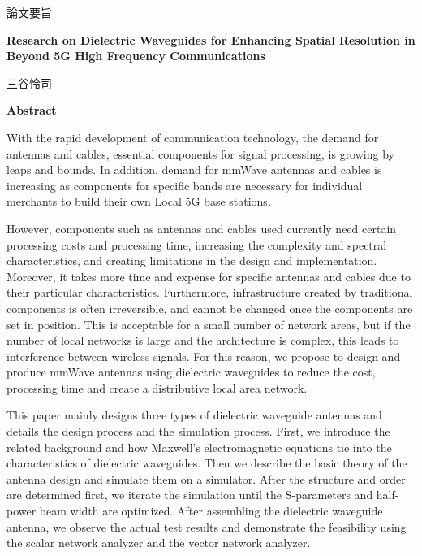 \documentclass[a4paper,12pt]{report}
\begin{document}
\thispagestyle{plain}
\begin{center}
    \Large
    \begin{CJK}{UTF8}{ipxm}論文要旨\end{CJK}

    \vspace{2.0cm}

    \Large
    \textbf{Research on Dielectric Waveguides for Enhancing Spatial Resolution in Beyond 5G High Frequency Communications}
        
    \vspace{0.4cm}
    \large
        
    \vspace{0.4cm}
    \begin{CJK}{UTF8}{ipxm}三谷怜司\end{CJK}
       
    \vspace{0.9cm}
    \textbf{Abstract}
\end{center}

With the rapid development of communication technology, the demand
for antennas and cables, essential components for signal processing,
is growing by leaps and
bounds.
In addition,
demand for mmWave antennas and cables is increasing as
components for specific bands are necessary for individual
merchants to build their own Local 5G base stations.

However, components such as antennas and cables used
currently need certain
processing costs and processing time,
increasing the complexity and spectral characteristics,
and creating limitations in the design and implementation.
Moreover, it takes
more time and expense for specific antennas and cables
due to their particular
characteristics.
Furthermore, infrastructure created by traditional components
is often irreversible, and cannot be changed once
the components are set in position.
This is acceptable for a small number of network areas, but if the number
of local networks is large and the architecture is complex,
this leads to interference between wireless signals.
For this reason, we propose to design and produce
mmWave antennas using dielectric waveguides to reduce the cost,
processing time
and create a distributive local area network.

This paper mainly designs three types of dielectric waveguide antennas
and details the design process and the simulation process.
First, we introduce the related background
and how Maxwell's electromagnetic equations tie into the characteristics
of dielectric waveguides.
Then we describe the basic theory of the antenna design
and simulate them on a simulator.
After the structure and order are determined first,
we iterate the simulation until
the S-parameters and half-power beam width are optimized.
After
assembling the dielectric waveguide antenna,
we observe the actual
test results and demonstrate the feasibility
using the scalar network analyzer and the vector network analyzer.
\end{document}

